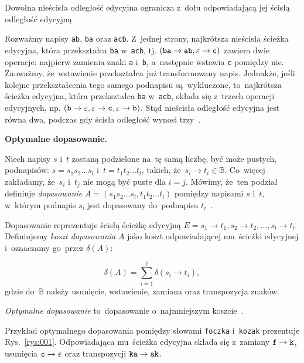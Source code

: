 \documentclass{praca1}
\begin{document}
\begin{lemma}
Dowolna nieścisła odległość edycyjna ogranicza z~dołu odpowiadającą jej ścisłą odległość edycyjną~\cite{Boytsov2011:indexingmethods}.
\end{lemma}

Rozważmy napisy \verb|ab|, \verb|ba| oraz \verb|acb|. Z~jednej strony, najkrótsza nieścisła ścieżka edycyjna, która przekształca \verb|ba| w~\verb|acb|, tj. $(\verb|ba| \rightarrow \verb|ab|, \varepsilon \rightarrow \verb|c|)$ zawiera dwie operacje: najpierw zamienia znaki \verb|a| i~\verb|b|, a~następnie wstawia \verb|c| pomiędzy nie. Zauważmy, że~wstawienie przekształca już transformowany napis. Jednakże, jeśli kolejne przekształcenia tego samego podnapisu są~wykluczone, to~najkrótsza ścieżka edycyjna, która przekształca \verb|ba| w~\verb|acb|, składa się z~trzech operacji edycyjnych, np. $(\verb|b| \rightarrow \varepsilon, \varepsilon \rightarrow \verb|c|, \varepsilon \rightarrow \verb|b|)$. Stąd nieścisła odległość edycyjna jest równa dwa, podczas gdy ścisła odległość wynosi trzy~\cite{Boytsov2011:indexingmethods}. 

\textbf{Optymalne dopasowanie.} 
\begin{definition}
Niech napisy $s$ i~$t$ zostaną podzielone na~tę samą liczbę, być może pustych, podnapisów: $s = s_1 s_2 \ldots s_l$ i~$t = t_1 t_2 \ldots t_l$, takich, że~$s_i \rightarrow t_i \in \mathbb{B}$. Co~więcej zakładamy, że~$s_i$ i~$t_j$ nie mogą być puste dla $i = j$. Mówimy, że~ten podział definiuje \emph{dopasowanie} $A = (s_1 s_2\ldots s_l, t_1 t_2 \ldots t_l)$ pomiędzy napisami $s$ i~$t$, w~którym podnapis $s_i$ jest dopasowany do~podnapisu $t_i$~\cite{Boytsov2011:indexingmethods}.
\end{definition}

Dopasowanie reprezentuje ścisłą ścieżkę edycyjną $E = s_1 \rightarrow t_1, s_2 \rightarrow t_2, \ldots, s_l \rightarrow t_l$. Definiujemy \emph{koszt dopasowania} $A$ jako koszt odpowiadającej mu~ścieżki edycyjnej i~oznaczamy go~przez $\delta(A)$:

\begin{equation}
\label{eq:003}
\delta(A) = \sum\limits_{i = 1}^{l} \delta(s_i \rightarrow t_i),
\end{equation}
gdzie do~$\mathbb{B}$ należy usunięcie, wstawienie, zamiana oraz transpozycja znaków.

\emph{Optymalne dopasowanie} to~dopasowanie o~najmniejszym koszcie~\cite{Boytsov2011:indexingmethods}.


\begin{example}
Przykład optymalnego dopasowania pomiędzy słowami \verb|foczka| i~\verb|kozak| prezentuje Rys.~\ref{rys:001}. Odpowiadająca mu~ścieżka edycyjna składa się z~zamiany $\verb|f| \rightarrow \verb|k|$, usunięcia $\verb|c| \rightarrow \varepsilon$ oraz transpozycji $\verb|ka| \rightarrow \verb|ak|$.
\end{example}
\end{document}
